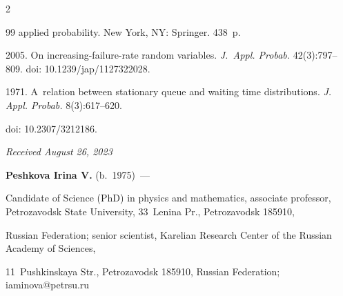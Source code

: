 \begin{multicols}{2}
{{\begin{thebibliography}{99}
{applied probability.} New York, NY: Springer. 438~p.











 2005. On increasing-failure-rate random variables. \textit{J.~Appl. Probab.} 42(3):797--809. doi: 10.1239/jap/1127322028.


 






 1971. A~relation between stationary queue and waiting time distributions. \textit{J. Appl. Probab.} 8(3):617--620.


doi: 10.2307/3212186.





\end{thebibliography}





 }


 }





\end{multicols}





\vspace*{-6pt}





\hfill{\small\textit{Received August 26, 2023}} 










\Contrl





\vspace*{-4pt}





\noindent


\textbf{Peshkova Irina V.} (b.\ 1975)~--- 


Candidate of Science (PhD) in physics and mathematics, associate professor, Petrozavodsk State University, 33~Lenina Pr., Petrozavodsk 185910, 


Russian Federation; senior scientist, Karelian Research Center of the Russian Academy of Sciences, 


11~Pushkinskaya Str., Petrozavodsk 185910, Russian Federation; \mbox{iaminova@petrsu.ru}








\label{end\stat}





\renewcommand{\bibname}{\protect\rm Литература} 


